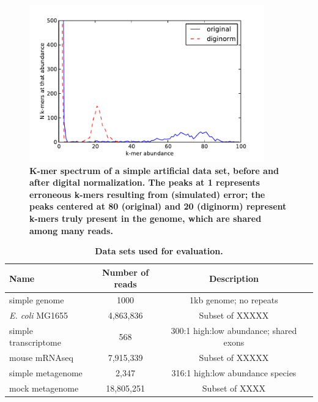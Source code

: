 \documentclass{article}
\begin{document}
\begin{figure}[!ht]
 \centerline{\includegraphics[width=4in]{./figures/kmer-spectrum}}
\caption{\bf K-mer spectrum of a simple artificial data set, before
  and after digital normalization.  The peaks at 1 represents
  erroneous k-mers resulting from (simulated) error; the peaks
  centered at 80 (original) and 20 (diginorm) represent k-mers truly
  present in the genome, which are shared among many reads.}
\label{fig:spectrum}
\end{figure}



\begin{table}

\centering
\begin{tabular}{|l|c|c|l|}
\hline
Name & Number of reads & Description \\
\hline
simple genome & 1000 & 1kb genome; no repeats \\
{\em E. coli} MG1655 & 4,863,836 & Subset of XXXXX \\
simple transcriptome & 568 & 300:1 high:low abundance; shared exons \\
mouse mRNAseq & 7,915,339 & Subset of XXXXX \\
simple metagenome & 2,347 & 316:1 high:low abundance species \\
mock metagenome & 18,805,251 & Subset of XXXX \\
\hline
\end{tabular}

\caption{{\bf Data sets used for evaluation.}}

\label{tab:data}
\end{table}
\end{document}
